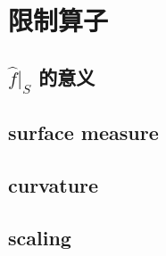 \section{限制算子}
\label{b2:sec:2301}


\subsection{\texorpdfstring{\(\widehat f|_S\)}{|S} 的意义}
\label{b2:subsec:230101}

\subsection{surface measure}
\label{b2:subsec:230102}

\subsection{curvature}
\label{b2:subsec:230103}

\subsection{scaling}
\label{b2:subsec:230104}


